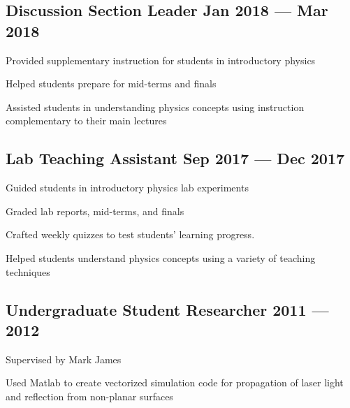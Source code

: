 \documentclass[letter,10pt]{article}
\begin{document}
\subsection{{Discussion Section Leader \hfill Jan 2018 --- Mar 2018}}
\begin{zitemize}
\item Provided supplementary instruction for students in introductory physics
\item Helped students prepare for mid-terms and finals
\item Assisted students in understanding physics concepts using instruction complementary to their main lectures
\end{zitemize}

\subsection{{Lab Teaching Assistant \hfill Sep 2017 --- Dec 2017}}
\begin{zitemize}
\item Guided students in introductory physics lab experiments
\item Graded lab reports, mid-terms, and finals
\item Crafted weekly quizzes to test students' learning progress.
\item Helped students understand physics concepts using a variety of teaching techniques
\end{zitemize}

\subsection{{Undergraduate Student Researcher \hfill 2011 --- 2012}}
\begin{zitemize}
\item Supervised by Mark James
\item Used Matlab to create vectorized simulation code for propagation of laser light and reflection from non-planar surfaces
\end{zitemize}

\end{document}
